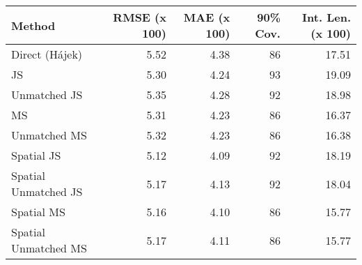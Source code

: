 
\begin{tabular}{lrrrr}
\toprule
Method & RMSE (x 100) & MAE (x 100) & 90\% Cov. & Int. Len. (x 100)\\
\midrule
Direct (Hájek) & 5.52 & 4.38 & 86 & 17.51\\
JS & 5.30 & 4.24 & 93 & 19.09\\
Unmatched JS & 5.35 & 4.28 & 92 & 18.98\\
MS & 5.31 & 4.23 & 86 & 16.37\\
Unmatched MS & 5.32 & 4.23 & 86 & 16.38\\
Spatial JS & 5.12 & 4.09 & 92 & 18.19\\
Spatial Unmatched JS & 5.17 & 4.13 & 92 & 18.04\\
Spatial MS & 5.16 & 4.10 & 86 & 15.77\\
Spatial Unmatched MS & 5.17 & 4.11 & 86 & 15.77\\
\bottomrule
\end{tabular}
